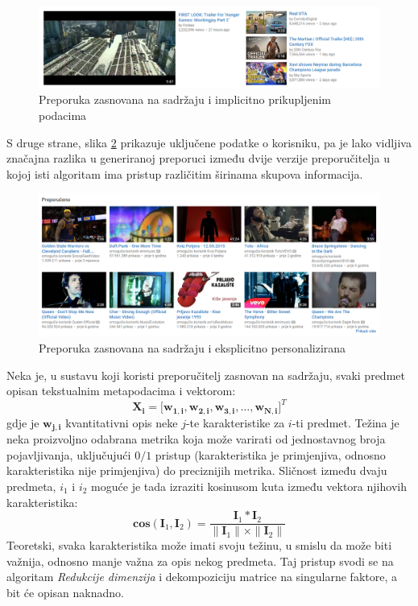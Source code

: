 \documentclass[times, utf8, diplomski, numeric]{fer}
\begin{document}
\begin{figure}[!htb]
	\centering
	\includegraphics[width=14.21cm]{images/content/nepersonalizirani.png}
	\caption{Preporuka zasnovana na sadržaju i implicitno prikupljenim podacima}
	\label{fig:contentnonpers}
\end{figure}

S druge strane, slika \ref{fig:contentpers} prikazuje uključene podatke o
korisniku, pa je lako vidljiva značajna razlika u generiranoj preporuci između
dvije verzije preporučitelja u kojoj isti algoritam ima pristup različitim
širinama skupova informacija. 

\begin{figure}[!htb]
	\centering
	\includegraphics[width=14.21cm]{images/content/personalizirani.png}
	\caption{Preporuka zasnovana na sadržaju i eksplicitno personalizirana}
	\label{fig:contentpers}
\end{figure}

Neka je, u sustavu koji koristi preporučitelj zasnovan na sadržaju, svaki
predmet opisan tekstualnim metapodacima i vektorom:
\begin{equation}
\label{eq:vektorKarakteristika}
	\boldsymbol{X_i} = 
		\big[ 
			\boldsymbol{w_{1,i}}, 
			\boldsymbol{w_{2,i}}, 
			\boldsymbol{w_{3,i}}, 
			\ldots, 
			\boldsymbol{w_{N,i}} 
		\big]^T
\end{equation}
gdje je $\boldsymbol{w_{j,i}}$ kvantitativni opis neke $j$-te karakteristike za
$i$-ti predmet. Težina je neka proizvoljno odabrana metrika koja može varirati
od jednostavnog broja pojavljivanja, uključujući $0/1$ pristup (karakteristika
je primjenjiva, odnosno karakteristika nije primjenjiva) do preciznijih
metrika. Sličnost između dvaju predmeta, $i_1$ i $i_2$ moguće je tada izraziti
kosinusom kuta između vektora njihovih karakteristika:
\begin{equation}
\label{eq:kosinus}
	\boldsymbol{cos}(\boldsymbol{I}_1, \boldsymbol{I}_2) = 
		\frac
			{\boldsymbol{I}_1 \ast \boldsymbol{I}_2}
			{\|\boldsymbol{I}_1\| \times \|\boldsymbol{I}_2\|}
\end{equation}
Teoretski, svaka karakteristika može imati svoju težinu, u smislu da može biti
važnija, odnosno manje važna za opis nekog predmeta. Taj pristup svodi se na
algoritam \emph{Redukcije dimenzija} i dekompoziciju matrice na singularne
faktore, a bit će opisan naknadno.
\end{document}
